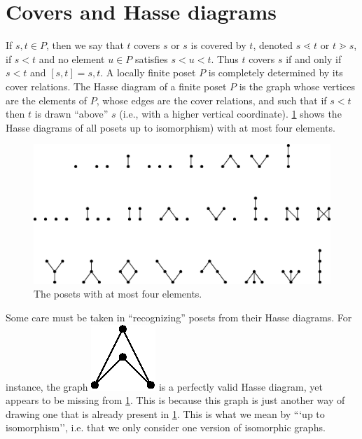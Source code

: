 \section{Covers and Hasse diagrams}

If $s, t \in P$, then we say that $t$ covers $s$ or $s$ is covered by $t$, denoted $s \lessdot t$ or $t \gtrdot s$, if $s < t$ and no element $u \in P$ satisfies $s < u < t$. Thus $t$ covers $s$ if and only if $s < t$ and $[s, t] = {s, t}$. A locally finite poset $P$ is completely determined by its cover relations. The Hasse diagram of a finite poset $P$ is the graph whose vertices are the elements of $P$, whose edges are the cover relations, and such that if $s < t$ then $t$ is drawn “above” $s$ (i.e., with a higher vertical coordinate). \ref{fig:stanley:3-1} shows the Hasse diagrams of all posets up to isomorphism) with at most four elements.

\begin{figure}
	\centering
	\includegraphics[width=\textwidth]{fig/stanley/3-1}
	\caption{\label{fig:stanley:3-1} The posets with at most four elements. \cite{Stanley:2011:ECV:2124415}}
\end{figure}

Some care must be taken in “recognizing” posets from their Hasse diagrams. For instance, the graph \includegraphics{fig/stanley/3-1:a} is a perfectly valid Hasse diagram, yet appears to be missing from \ref{fig:stanley:3-1}. This is because this graph is just another way of drawing one that is already present in \ref{fig:stanley:3-1}. This is what we mean by ```up to isomorphism'', i.e. that we only consider one version of isomorphic graphs.


